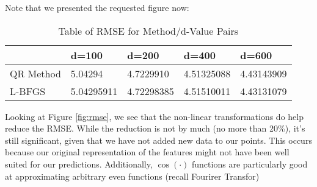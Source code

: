 \documentclass[submit]{harvardml}
\theoremstyle{plain}
\begin{document}
Note that we presented the requested figure now:
\begin{figure}[h!]
\end{figure}
\begin{table}[h!]
\centering
\caption{Table of RMSE for Method/d-Value Pairs}
\label{my-label}
\begin{tabular}{|l|l|l|l|l|}
\hline
          & d=100      & d=200      & d=400      & d=600      \\ \hline
QR Method & 5.04294    & 4.7229910  & 4.51325088 & 4.43143909 \\ \hline
L-BFGS    & 5.04295911 & 4.72298385 & 4.51510011 & 4.43131079 \\ \hline
\end{tabular}
\end{table}
\item Looking at Figure \ref{fig:rmse}, we see that the non-linear transformations do help reduce the RMSE. While the reduction is not by much (no more than 20\%), it's still significant, given that we have not added new data to our points. This occurs because our original representation of the features might not have been well suited for our predictions. Additionally, $\cos(\cdot)$ functions are particularly good at approximating arbitrary even functions (recall Fourirer Transfor)
\end{document}
